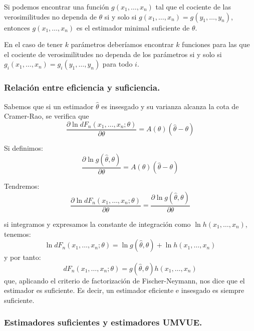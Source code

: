 Si podemos encontrar una funci\'on $g(x_1,\ldots,x_n)$ tal que el cociente de las verosimilitudes no dependa de $\theta$ si y solo si $g(x_1,\ldots,x_n)=g(y_1,\ldots,y_n)$, entonces $g(x_1,\ldots,x_n)$ es el estimador minimal suficiente de $\theta$.

En el caso de tener $k$ par\'ametros deber\'iamos encontrar $k$ funciones para las que el cociente de verosimilitudes no dependa de los par\'ametros si y solo si $g_i(x_1,\ldots,x_n)=g_i(y_1,\ldots,y_n)$ para todo $i$.

\subsubsection{Relaci\'on entre eficiencia y suficiencia.}

Sabemos que si un estimador $\hat{\theta}$ es insesgado y su varianza alcanza la cota de Cramer-Rao, se verifica que 
\begin{equation*}
\frac{\partial\ln{dF_n(x_1,\ldots,x_n;\theta)}}{\partial\theta}=A(\theta)(\hat{\theta}-\theta)
\end{equation*}

Si definimos:
\begin{equation*}
\frac{\partial\ln{g(\hat{\theta},\theta)}}{\partial\theta}=A(\theta)(\hat{\theta}-\theta)
\end{equation*}

Tendremos:
\begin{equation*}
\frac{\partial\ln{dF_n(x_1,\ldots,x_n;\theta)}}{\partial\theta}=\frac{\partial\ln{g(\hat{\theta},\theta)}}{\partial\theta}
\end{equation*}

si integramos y expresamos la constante de integraci\'on como $\ln{h(x_1,\ldots,x_n)}$, tenemos:
\begin{equation*}
\ln{dF_n(x_1,\ldots,x_n;\theta)}=\ln{g(\hat{\theta},\theta)}+\ln{h(x_1,\ldots,x_n)}
\end{equation*}
y por tanto:
\begin{equation*}
dF_n(x_1,\ldots,x_n;\theta)=g(\hat{\theta},\theta)h(x_1,\ldots,x_n)
\end{equation*}
que, aplicando el criterio de factorizaci\'on de Fischer-Neymann, nos dice que el estimador es suficiente. Es decir, un estimador eficiente e insesgado es siempre suficiente.

\subsubsection{Estimadores suficientes y estimadores UMVUE.}

